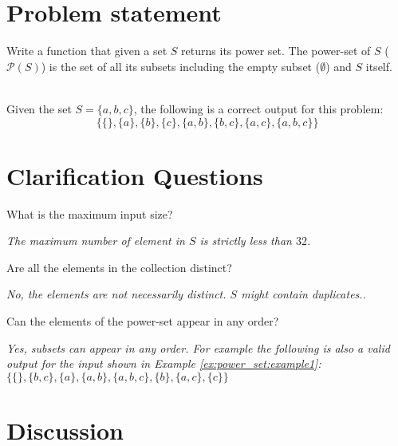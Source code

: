 \section{Problem statement}
    \begin{exercise}
        Write a function that given a set $S$ returns its power set.
The power-set of $S$ ($\mathcal{P}(S)$) is the set of all its subsets including the empty subset ($\emptyset$) and $S$ itself.

        \begin{example}
            \label{ex:power_set:example1}
            \hfill \\
            Given the set $S=\{a,b,c\}$, the following is a correct output for
            this problem: $$\{\{\}, \{a\}, \{b\}, \{c\}, \{a,b\}, \{b,c\}, \{a,c\}, \{a,b,c\} \}$$
        \end{example}
    \end{exercise}

\section{Clarification Questions}

\begin{QandA}
    \item What is the maximum input size?
    \begin{answered}
        \textit{The maximum number of element in $S$ is strictly less than $32$.}
    \end{answered}
    
    \item Are all the elements in the collection distinct?
    \begin{answered}
        \textit{No, the elements are not necessarily distinct. $S$ might contain duplicates..}
    \end{answered}

    \item Can the elements of the power-set appear in any order?
    \begin{answered}
        \textit{Yes, subsets can appear in any order. 
        For example the following is also a valid output for the input shown in Example \ref{ex:power_set:example1}:} 
        $\{\{\}, \{b,c\}, \{a\}, \{a,b\}, \{a,b,c\}, \{b\}, \{a,c\}, \{c\} \}$
    \end{answered}
\end{QandA}

\section{Discussion}
\label{sec:powerset:discussion}

